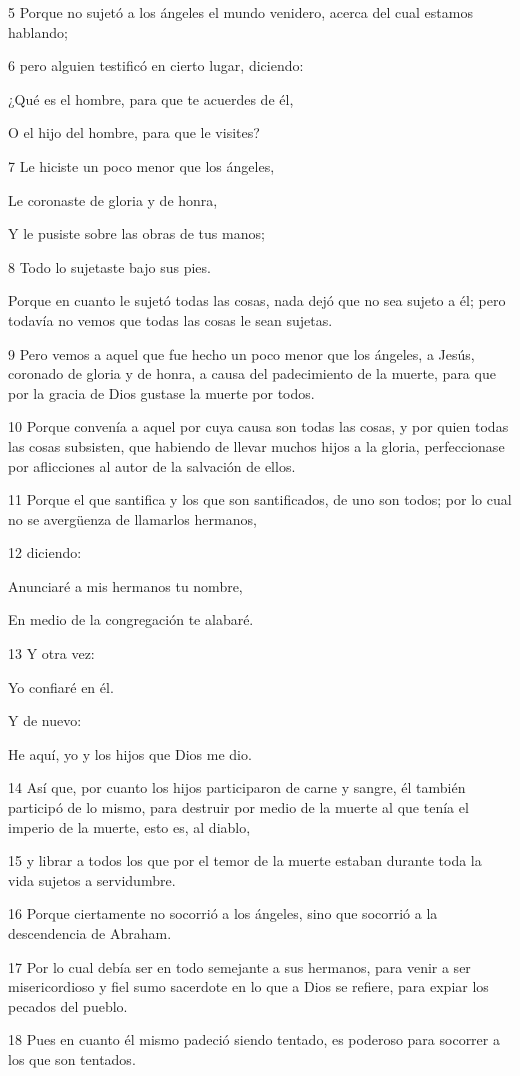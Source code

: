 \par 5 Porque no sujetó a los ángeles el mundo venidero, acerca del cual estamos hablando;
\par 6 pero alguien testificó en cierto lugar, diciendo:
\par ¿Qué es el hombre, para que te acuerdes de él,
\par O el hijo del hombre, para que le visites?
\par 7 Le hiciste un poco menor que los ángeles,
\par Le coronaste de gloria y de honra,
\par Y le pusiste sobre las obras de tus manos;
\par 8 Todo lo sujetaste bajo sus pies.
\par Porque en cuanto le sujetó todas las cosas, nada dejó que no sea sujeto a él; pero todavía no vemos que todas las cosas le sean sujetas.
\par 9 Pero vemos a aquel que fue hecho un poco menor que los ángeles, a Jesús, coronado de gloria y de honra, a causa del padecimiento de la muerte, para que por la gracia de Dios gustase la muerte por todos.
\par 10 Porque convenía a aquel por cuya causa son todas las cosas, y por quien todas las cosas subsisten, que habiendo de llevar muchos hijos a la gloria, perfeccionase por aflicciones al autor de la salvación de ellos.
\par 11 Porque el que santifica y los que son santificados, de uno son todos; por lo cual no se avergüenza de llamarlos hermanos,
\par 12 diciendo:
\par Anunciaré a mis hermanos tu nombre,
\par En medio de la congregación te alabaré.
\par 13 Y otra vez:
\par Yo confiaré en él.
\par Y de nuevo:
\par He aquí, yo y los hijos que Dios me dio.
\par 14 Así que, por cuanto los hijos participaron de carne y sangre, él también participó de lo mismo, para destruir por medio de la muerte al que tenía el imperio de la muerte, esto es, al diablo,
\par 15 y librar a todos los que por el temor de la muerte estaban durante toda la vida sujetos a servidumbre.
\par 16 Porque ciertamente no socorrió a los ángeles, sino que socorrió a la descendencia de Abraham.
\par 17 Por lo cual debía ser en todo semejante a sus hermanos, para venir a ser misericordioso y fiel sumo sacerdote en lo que a Dios se refiere, para expiar los pecados del pueblo.
\par 18 Pues en cuanto él mismo padeció siendo tentado, es poderoso para socorrer a los que son tentados.

